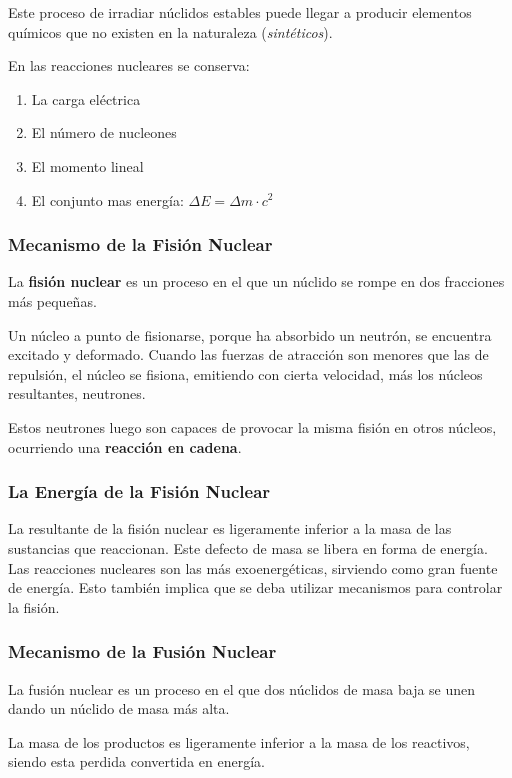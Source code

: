 \documentclass[10pt]{article}
\begin{document}
Este proceso de irradiar núclidos estables puede llegar a producir elementos químicos que no existen en la naturaleza (\textit{sintéticos}).

En las reacciones nucleares se conserva:
\begin{enumerate}
    \item La carga eléctrica
    \item El número de nucleones
    \item El momento lineal
    \item El conjunto mas energía: $\Delta E = \Delta m \cdot c ^{2}$
\end{enumerate}

\subsubsection{Mecanismo de la Fisión Nuclear}

La \textbf{fisión nuclear} es un proceso en el que un núclido se rompe en dos fracciones más pequeñas.

Un núcleo a punto de fisionarse, porque ha absorbido un neutrón, se encuentra excitado y deformado. Cuando las fuerzas de atracción son menores que las de repulsión, el núcleo se fisiona, emitiendo con cierta velocidad, más los núcleos resultantes, neutrones.

Estos neutrones luego son capaces de provocar la misma fisión en otros núcleos, ocurriendo una \textbf{reacción en cadena}.

\subsubsection{La Energía de la Fisión Nuclear}

La resultante de la fisión nuclear es ligeramente inferior a la masa de las sustancias que reaccionan. Este defecto de masa se libera en forma de energía. Las reacciones nucleares son las más exoenergéticas, sirviendo como gran fuente de energía. Esto también implica que se deba utilizar mecanismos para controlar la fisión.

\subsubsection{Mecanismo de la Fusión Nuclear}

La fusión nuclear es un proceso en el que dos núclidos de masa baja se unen dando un núclido de masa más alta.

La masa de los productos es ligeramente inferior a la masa de los reactivos, siendo esta perdida convertida en energía.
\end{document}
